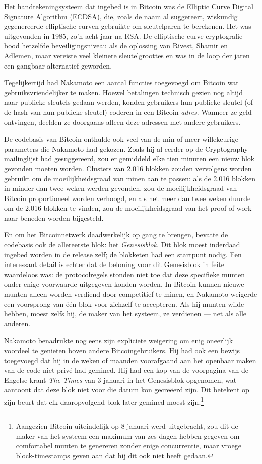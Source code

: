 \documentclass[
  a5paper,
  smalldemyvopaper,11pt,twoside,onecolumn,openright,extrafontsizes,
hidelinks]{memoir}
\begin{document}
Het handtekeningsysteem dat ingebed is in Bitcoin was de Elliptic Curve
Digital Signature Algorithm (ECDSA), die, zoals de naam al suggereert,
wiskundig gegenereerde elliptische curven gebruikte om sleutelparen te
berekenen. Het was uitgevonden in 1985, zo'n acht jaar na RSA. De
elliptische curve-cryptografie bood hetzelfde beveiligingsniveau als de
oplossing van Rivest, Shamir en Adlemen, maar vereiste veel kleinere
sleutelgroottes en was in de loop der jaren een gangbaar alternatief
geworden.

Tegelijkertijd had Nakamoto een aantal functies toegevoegd om Bitcoin
wat gebruiksvriendelijker te maken. Hoewel betalingen technisch gezien
nog altijd naar publieke sleutels gedaan werden, konden gebruikers hun
publieke sleutel (of de hash van hun publieke sleutel) coderen in een
Bitcoin-\emph{adres}. Wanneer ze geld ontvingen, deelden ze doorgaans
alleen deze adressen met andere gebruikers.

De codebasis van Bitcoin onthulde ook veel van de min of meer
willekeurige parameters die Nakamoto had gekozen. Zoals hij al eerder op
de Cryptography-mailinglijst had gesuggereerd, zou er gemiddeld elke
tien minuten een nieuw blok gevonden moeten worden. Clusters van 2.016
blokken zouden vervolgens worden gebruikt om de moeilijkheidsgraad van
minen aan te passen: als de 2.016 blokken in minder dan twee weken
werden gevonden, zou de moeilijkheidsgraad van Bitcoin proportioneel
worden verhoogd, en als het meer dan twee weken duurde om de 2.016
blokken te vinden, zou de moeilijkheidsgraad van het proof-of-work naar
beneden worden bijgesteld.

En om het Bitcoinnetwerk daadwerkelijk op gang te brengen, bevatte de
codebasis ook de allereerste blok: het \emph{Genesisblok}. Dit blok
moest inderdaad ingebed worden in de release zelf; de blokketen had een
startpunt nodig. Een interessant detail is echter dat de beloning voor
dit Genesisblok in feite waardeloos was: de protocolregels stonden niet
toe dat deze specifieke munten onder enige voorwaarde uitgegeven konden
worden. In Bitcoin kunnen nieuwe munten alleen worden verdiend door
competitief te minen, en Nakamoto weigerde een voorsprong van één blok
voor zichzelf te accepteren. Als hij munten wilde hebben, moest zelfs
hij, de maker van het systeem, ze verdienen --- net als alle anderen.

Nakamoto benadrukte nog eens zijn expliciete weigering om enig oneerlijk
voordeel te genieten boven andere Bitcoingebruikers. Hij had ook een
bewijs toegevoegd dat hij in de weken of maanden voorafgaand aan het
openbaar maken van de code niet privé had gemined. Hij had een kop van
de voorpagina van de Engelse krant \emph{The Times} van 3 januari in het
Genesisblok opgenomen, wat aantoont dat deze blok niet voor die datum
kon gecreëerd zijn. Dit betekent op zijn beurt dat elk daaropvolgend
blok later gemined moest zijn.\footnote{Aangezien Bitcoin uiteindelijk
  op 8 januari werd uitgebracht, zou dit de maker van het systeem een
  maximum van zes dagen hebben gegeven om comfortabel munten te
  genereren zonder enige concurrentie, maar vroege block-timestamps
  geven aan dat hij dit ook niet heeft gedaan.}
\end{document}
